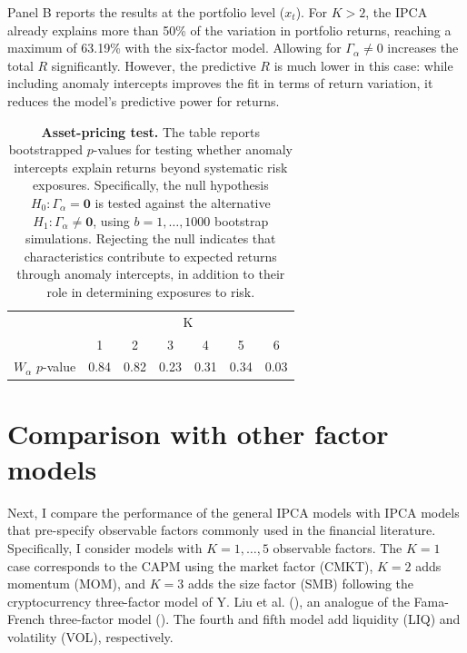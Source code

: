 \documentclass[
  12pt,
  a4paper,
  openany]{scrbook}
\begin{document}
Panel B reports the results at the portfolio level (\(x_t\)). For
\(K>2\), the IPCA already explains more than 50\% of the variation in
portfolio returns, reaching a maximum of 63.19\% with the six-factor
model. Allowing for \(\Gamma_\alpha \neq 0\) increases the total \(R\)
significantly. However, the predictive \(R\) is much lower in this case:
while including anomaly intercepts improves the fit in terms of return
variation, it reduces the model's predictive power for returns.

\begin{table}
\centering
\small
\caption[Asset-pricing test]%
{%
\textbf{Asset-pricing test.}
The table reports bootstrapped $p$-values for testing whether anomaly intercepts explain returns beyond systematic risk exposures. Specifically, the null hypothesis $H_{0}: \Gamma_{\alpha} = \mathbf{0}$ is tested against the alternative $H_{1}: \Gamma_{\alpha} \neq \mathbf{0}$, using $b = 1, \dots, 1000$ bootstrap simulations. Rejecting the null indicates that characteristics contribute to expected returns through anomaly intercepts, in addition to their role in determining exposures to risk.
}
\label{tbl-alphatest}
\vspace{5pt} %
\begin{tabular}{lcccccc}
\toprule
 & \multicolumn{6}{c}{K} \\
\cmidrule(lr){2-7}
 &  1 & 2 & 3 & 4 & 5 & 6 \\
\midrule\addlinespace[2.5pt]
$W_\alpha$ $p$-value  & 0.84 & 0.82 & 0.23 & 0.31 & 0.34 & 0.03 \\
\bottomrule
\end{tabular}
\end{table}

\section{Comparison with other factor
models}\label{comparison-with-other-factor-models}

Next, I compare the performance of the general IPCA models with IPCA
models that pre-specify observable factors commonly used in the
financial literature. Specifically, I consider models with
\(K=1,\dots,5\) observable factors. The \(K=1\) case corresponds to the
CAPM using the market factor (CMKT), \(K=2\) adds momentum (MOM), and
\(K=3\) adds the size factor (SMB) following the cryptocurrency
three-factor model of Y. Liu et al.
(), an analogue of the Fama-French
three-factor model (). The fourth and fifth model add liquidity (LIQ) and volatility
(VOL), respectively.
\end{document}
